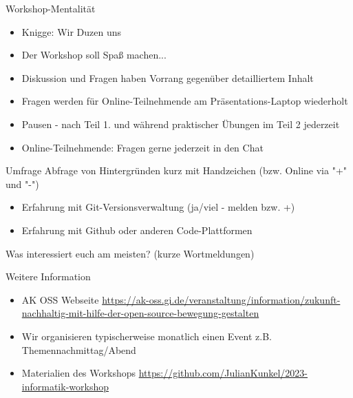 \documentclass[compress,aspectratio=169]{beamer}
\begin{document}
\begin{frame}{Workshop-Mentalität}
  \begin{itemize}
    \item Knigge: Wir Duzen uns
    \item Der Workshop soll Spaß machen...
    \item Diskussion und Fragen haben Vorrang gegenüber detailliertem Inhalt
    \item Fragen werden für Online-Teilnehmende am Präsentations-Laptop wiederholt
    \item Pausen - nach Teil 1. und während praktischer Übungen im Teil 2 jederzeit
    \item Online-Teilnehmende: Fragen gerne jederzeit in den Chat
  \end{itemize}
\end{frame}

\begin{frame}{Umfrage}
  Abfrage von Hintergründen kurz mit Handzeichen (bzw. Online via "+" und "-")
  \begin{itemize}
    \item Erfahrung mit Git-Versionsverwaltung (ja/viel - melden bzw. +)
    \item Erfahrung mit Github oder anderen Code-Plattformen    
  \end{itemize}

 Was interessiert euch am meisten? (kurze Wortmeldungen)
\end{frame}


\begin{frame}{Weitere Information}
  \begin{itemize}
    \item AK OSS Webseite \url{https://ak-oss.gi.de/veranstaltung/information/zukunft-nachhaltig-mit-hilfe-der-open-source-bewegung-gestalten} 
    \item Wir organisieren typischerweise monatlich einen Event z.B. Themennachmittag/Abend
    \item Materialien des Workshops \url{https://github.com/JulianKunkel/2023-informatik-workshop}
  \end{itemize}

\end{frame}
\end{document}
